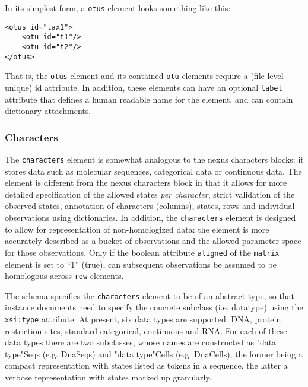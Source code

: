 \documentclass{article}
\newcommand{\code}{\texttt} \usepackage{fullpage}
\begin{document}
In its simplest form, a \code{otus} element looks something like this:
\begin{verbatim} 
<otus id="tax1"> 
    <otu id="t1"/> 
    <otu id="t2"/> 
</otus>
\end{verbatim} That is, the \code{otus} element and its contained
\code{otu} elements require a (file level unique) id attribute. In
addition, these elements can have an optional \code{label} attribute
that defines a human readable name for the element, and can contain
dictionary attachments.

\subsubsection{Characters} 

The \code{characters} element is somewhat analogous to the nexus
characters blocks: it stores data such as molecular sequences,
categorical data or continuous data. The element is different from the
nexus characters block in that it allows for more detailed specification
of the allowed states \textit{per character}, strict validation of the
observed states, annotation of characters (columns), states, rows and
individual observations using dictionaries. In addition, the
\code{characters} element is designed to allow for representation of
non-homologized data: the element is more accurately described as a
bucket of observations and the allowed parameter space for those
observations. Only if the boolean attribute \code{aligned} of the
\code{matrix} element is set to ``1'' (true), can subsequent
observations be assumed to be homologous across \code{row} elements.

The schema specifies the \code{characters} element to be of an abstract
type, so that instance documents need to specify the concrete subclass
(i.e. datatype) using the \code{xsi:type} attribute. At present, six
data types are supported: DNA, protein, restriction sites, standard
categorical, continuous and RNA. For each of these data types there are
two subclasses, whose names are constructed as "data type"Seqs (e.g.
DnaSeqs) and "data type"Cells (e.g. DnaCells), the former being a
compact representation with states listed as tokens in a sequence, the
latter a verbose representation with states marked up granularly.
\end{document}
